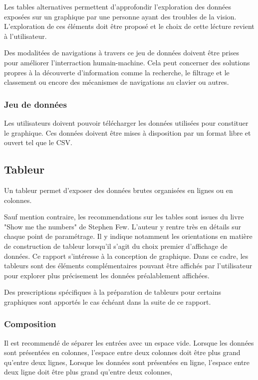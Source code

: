 \documentclass[a4paper,12pt]{article}
\begin{document}
\begin{multicols}{2}
Les tables alternatives permettent d'approfondir l'exploration des données exposées sur un graphique par une personne ayant des troubles de la vision. L'exploration de ces éléments doit être proposé et le choix de cette lécture revient à l'utilisateur. \autocite{sarahfossheimCreatingBetterScreen2022}

Des modalitées de navigations à travers ce jeu de données doivent être prises pour améliorer l'interraction humain-machine. Cela peut concerner des solutions propres à la découverte d'information comme la recherche, le filtrage et le classement ou encore des mécanismes de navigations au clavier ou autres. \autocite{sarahfossheimCreatingBetterScreen2022}
\subsubsection*{Jeu de données}
\label{sec:org44e64e5}
Les utilisateurs doivent pouvoir télécharger les données utilisées pour constituer le graphique. Ces données doivent être mises à disposition par un format libre et ouvert tel que le CSV. \autocite{frankelavskyRightToolsJob2022}
\subsection*{Tableur}
\label{sec:org5e7805a}
Un tableur permet d'exposer des données brutes organisées en lignes ou en colonnes. \autocite{mikeyiHowChooseRight2020}

Sauf mention contraire, les recommendations sur les tables sont issues du livre "Show me the numbers" de Stephen Few.\autocite{stephenfewShowMeNumbers2012} L'auteur y rentre très en détails sur chaque point de paramétrage. Il y indique notamment les orientations en matière de construction de tableur lorsqu'il s'agit du choix premier d'affichage de données. Ce rapport s'intéresse à la conception de graphique. Dans ce cadre, les tableurs sont des éléments complémentaires pouvant être affichés par l'utilisateur pour explorer plus précisement les données préalablement affichées.

Des prescriptions spécifiques à la préparation de tableurs pour certains graphiques sont apportés le cas échéant dans la suite de ce rapport.
\subsubsection*{Composition}
\label{sec:orga990a92}
Il est recommendé de séparer les entrées avec un espace vide.
Lorsque les données sont présentées en colonnes, l'espace entre deux colonnes doit être plus grand qu'entre deux lignes,
Lorsque les données sont présentées en ligne, l'espace entre deux ligne doit être plus grand qu'entre deux colonnes,


\end{multicols}
\end{document}

